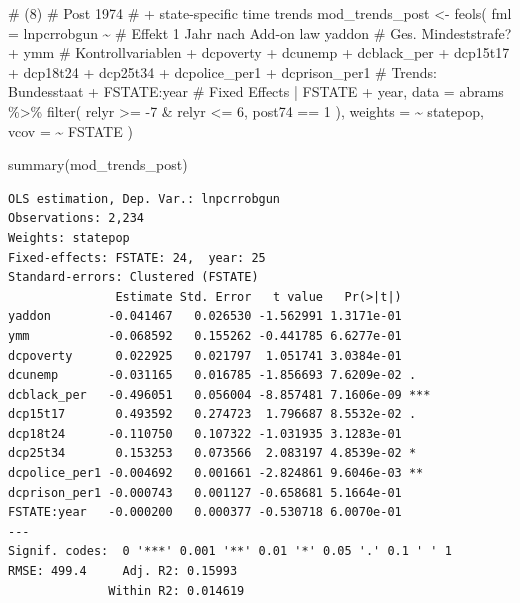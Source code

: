 \documentclass[
  a4paper,
  DIV=11,
  oneside]{scrreprt}
\newenvironment{Shaded}{\begin{snugshade}}{\end{snugshade}}
\newcommand{\AttributeTok}[1]{\textcolor[rgb]{0.40,0.45,0.13}{#1}}
\newcommand{\CommentTok}[1]{\textcolor[rgb]{0.37,0.37,0.37}{#1}}
\newcommand{\DecValTok}[1]{\textcolor[rgb]{0.68,0.00,0.00}{#1}}
\newcommand{\FunctionTok}[1]{\textcolor[rgb]{0.28,0.35,0.67}{#1}}
\newcommand{\NormalTok}[1]{\textcolor[rgb]{0.00,0.23,0.31}{#1}}
\newcommand{\OtherTok}[1]{\textcolor[rgb]{0.00,0.23,0.31}{#1}}
\newcommand{\SpecialCharTok}[1]{\textcolor[rgb]{0.37,0.37,0.37}{#1}}
\begin{document}
\begin{Shaded}
\begin{Highlighting}[]
\CommentTok{\# (8)}
\CommentTok{\# Post 1974}
\CommentTok{\# + state{-}specific time trends}
\NormalTok{mod\_trends\_post }\OtherTok{\textless{}{-}} \FunctionTok{feols}\NormalTok{(}
  \AttributeTok{fml =}\NormalTok{ lnpcrrobgun }\SpecialCharTok{\textasciitilde{}}
        \CommentTok{\# Effekt 1 Jahr nach Add{-}on law}
\NormalTok{        yaddon}
        \CommentTok{\# Ges. Mindeststrafe?}
      \SpecialCharTok{+}\NormalTok{ ymm}
        \CommentTok{\# Kontrollvariablen}
      \SpecialCharTok{+}\NormalTok{ dcpoverty}
      \SpecialCharTok{+}\NormalTok{ dcunemp}
      \SpecialCharTok{+}\NormalTok{ dcblack\_per}
      \SpecialCharTok{+}\NormalTok{ dcp15t17}
      \SpecialCharTok{+}\NormalTok{ dcp18t24 }
      \SpecialCharTok{+}\NormalTok{ dcp25t34}
      \SpecialCharTok{+}\NormalTok{ dcpolice\_per1}
      \SpecialCharTok{+}\NormalTok{ dcprison\_per1}
      \CommentTok{\# Trends: Bundesstaat}
      \SpecialCharTok{+}\NormalTok{ FSTATE}\SpecialCharTok{:}\NormalTok{year}
      \CommentTok{\# Fixed Effects}
      \SpecialCharTok{|}\NormalTok{ FSTATE }\SpecialCharTok{+}\NormalTok{ year,}
      \AttributeTok{data =}\NormalTok{ abrams }\SpecialCharTok{\%\textgreater{}\%} 
        \FunctionTok{filter}\NormalTok{(}
\NormalTok{          relyr }\SpecialCharTok{\textgreater{}=} \SpecialCharTok{{-}}\DecValTok{7} \SpecialCharTok{\&}\NormalTok{ relyr }\SpecialCharTok{\textless{}=} \DecValTok{6}\NormalTok{, }
\NormalTok{          post74 }\SpecialCharTok{==} \DecValTok{1}
\NormalTok{        ), }
      \AttributeTok{weights =} \SpecialCharTok{\textasciitilde{}}\NormalTok{ statepop, }
      \AttributeTok{vcov =} \SpecialCharTok{\textasciitilde{}}\NormalTok{ FSTATE}
\NormalTok{)}

\FunctionTok{summary}\NormalTok{(mod\_trends\_post)}
\end{Highlighting}
\end{Shaded}

\begin{verbatim}
OLS estimation, Dep. Var.: lnpcrrobgun
Observations: 2,234
Weights: statepop
Fixed-effects: FSTATE: 24,  year: 25
Standard-errors: Clustered (FSTATE) 
               Estimate Std. Error   t value   Pr(>|t|)    
yaddon        -0.041467   0.026530 -1.562991 1.3171e-01    
ymm           -0.068592   0.155262 -0.441785 6.6277e-01    
dcpoverty      0.022925   0.021797  1.051741 3.0384e-01    
dcunemp       -0.031165   0.016785 -1.856693 7.6209e-02 .  
dcblack_per   -0.496051   0.056004 -8.857481 7.1606e-09 ***
dcp15t17       0.493592   0.274723  1.796687 8.5532e-02 .  
dcp18t24      -0.110750   0.107322 -1.031935 3.1283e-01    
dcp25t34       0.153253   0.073566  2.083197 4.8539e-02 *  
dcpolice_per1 -0.004692   0.001661 -2.824861 9.6046e-03 ** 
dcprison_per1 -0.000743   0.001127 -0.658681 5.1664e-01    
FSTATE:year   -0.000200   0.000377 -0.530718 6.0070e-01    
---
Signif. codes:  0 '***' 0.001 '**' 0.01 '*' 0.05 '.' 0.1 ' ' 1
RMSE: 499.4     Adj. R2: 0.15993 
              Within R2: 0.014619
\end{verbatim}
\end{document}
